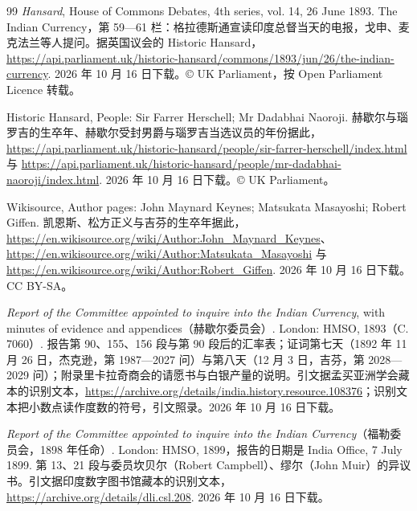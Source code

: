 \begin{thebibliography}{99}
 \emph{Hansard}, House of Commons Debates, 4th series, vol. 14, 26 June 1893. The Indian Currency，第 59—61 栏：格拉德斯通宣读印度总督当天的电报，戈申、麦克法兰等人提问。据英国议会的 Historic Hansard，\url{https://api.parliament.uk/historic-hansard/commons/1893/jun/26/the-indian-currency}. 2026 年 10 月 16 日下载。© UK Parliament，按 Open Parliament Licence 转载。

 Historic Hansard, People: Sir Farrer Herschell; Mr Dadabhai Naoroji. 赫歇尔与瑙罗吉的生卒年、赫歇尔受封男爵与瑙罗吉当选议员的年份据此，\url{https://api.parliament.uk/historic-hansard/people/sir-farrer-herschell/index.html} 与 \url{https://api.parliament.uk/historic-hansard/people/mr-dadabhai-naoroji/index.html}. 2026 年 10 月 16 日下载。© UK Parliament。

 Wikisource, Author pages: John Maynard Keynes; Matsukata Masayoshi; Robert Giffen. 凯恩斯、松方正义与吉芬的生卒年据此，\url{https://en.wikisource.org/wiki/Author:John_Maynard_Keynes}、\url{https://en.wikisource.org/wiki/Author:Matsukata_Masayoshi} 与 \url{https://en.wikisource.org/wiki/Author:Robert_Giffen}. 2026 年 10 月 16 日下载。CC BY-SA。

 \emph{Report of the Committee appointed to inquire into the Indian Currency}, with minutes of evidence and appendices（赫歇尔委员会）. London: HMSO, 1893（C. 7060）. 报告第 90、155、156 段与第 90 段后的汇率表；证词第七天（1892 年 11 月 26 日，杰克逊，第 1987—2027 问）与第八天（12 月 3 日，吉芬，第 2028—2029 问）；附录里卡拉奇商会的请愿书与白银产量的说明。引文据孟买亚洲学会藏本的识别文本，\url{https://archive.org/details/india.history.resource.108376}；识别文本把小数点读作度数的符号，引文照录。2026 年 10 月 16 日下载。

 \emph{Report of the Committee appointed to inquire into the Indian Currency}（福勒委员会，1898 年任命）. London: HMSO, 1899，报告的日期是 India Office, 7 July 1899. 第 13、21 段与委员坎贝尔（Robert Campbell）、缪尔（John Muir）的异议书。引文据印度数字图书馆藏本的识别文本，\url{https://archive.org/details/dli.csl.208}. 2026 年 10 月 16 日下载。


\end{thebibliography}
